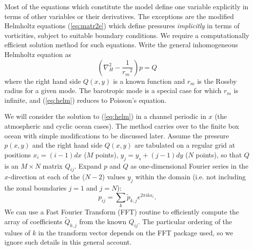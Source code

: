 \documentclass[11pt, a4paper,twoside]{article}
\newcommand{\rdm}[0]{{r_m}}
\numberwithin{equation}{section}
\begin{document}
Most of the equations which constitute the model define one variable explicitly in terms of other variables or their derivatives.
The exceptions are the modified Helmholtz equations (\ref{eq:matr2e}) which define pressures \emph{implicitly} in terms of vorticities, subject to suitable boundary conditions.
We require a computationally efficient solution method for such equations.
Write the general inhomogeneous Helmholtz equation as
\begin{equation}\label{eq:helm}
\left(\nabla_H^2 - \frac{1}{\rdm^2}\right) p = Q
\end{equation}
where the right hand side $ Q(x,y)$ is a known function and $\rdm$ is the Rossby radius for a given mode.
The barotropic mode is a special case for which $\rdm$ is infinite, and (\ref{eq:helm}) reduces to Poisson's equation.

We will consider the solution to (\ref{eq:helm}) in a channel periodic in $x$ (the atmospheric and cyclic ocean cases).
The method carries over to the finite box ocean with simple modifications to be discussed later.
Assume the pressure $p(x,y)$ and the right hand side $ Q(x,y)$ are tabulated on a regular grid at positions $x_i = (i-1)dx$  ($M$ points),  $y_j = y_s + (j-1)dy$ ($N$ points), so that $ Q$ is an $M \times N$ matrix $ Q_{ij}$.
Expand $p$ and $ Q$ as one-dimensional Fourier series in the $x$-direction at each of the ($N-2$) values $y_j$ within the domain (i.e. not including the zonal boundaries $j=1$ and $j=N$):
\begin{equation}\label{eq:four6}
p_{ij} = \sum_k \tilde{p}_{k,j} e^{2\pi i k x_i}.
\end{equation}
We can use a Fast Fourier Transform (FFT) routine to efficiently compute the array of coefficients $\tilde{ Q}_{k,j}$ from the known $ Q_{ij}$.
The particular ordering of the values of $k$ in the transform vector depends on the FFT package used, so we ignore such details in this general account.
\end{document}
